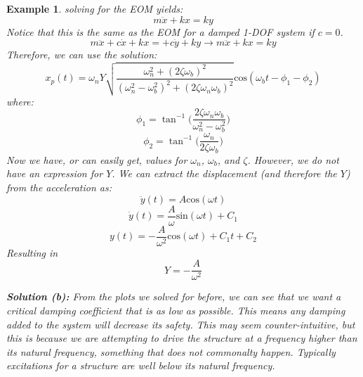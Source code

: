 \documentclass[12pt,letter]{article}
\newtheorem{ex}{Example}
\numberwithin{ex}{section} %
\newenvironment{example}{\begin{mdframed}[middlelinewidth=0.5mm]\begin{ex}\normalfont}{\end{ex}\end{mdframed}}
\numberwithin{re}{section} %
\numberwithin{vcs}{section} %
\begin{document}
\begin{example}
					solving for the EOM yields:
					\begin{equation}
						m\ddot{x} + kx = ky
					\end{equation} 				
					Notice that this is the same as the EOM for a damped 1-DOF system if $c=0$.	
					\begin{equation}
					m\ddot{x} + c\dot{x} + kx = + c\dot{y} + ky \rightarrow m\ddot{x} + kx = ky
					\end{equation}
					Therefore, we can use the solution:
					\begin{equation}
						x_p(t) = 	\omega_n Y   \sqrt{\frac{\omega_n^2 + (2 \zeta \omega_b)^2 }{(\omega_n^2 - \omega_b^2)^2 +  (2\zeta \omega_n \omega_b)^2} }  \text{cos}(\omega_bt - \phi_1 - \phi_2)
					\end{equation}
					where:
					\begin{equation}
						\phi_1 = \tan^{-1} \bigg(\frac{2\zeta \omega_n \omega_b}{\omega_n^2 - \omega_b^2}\bigg)
					\end{equation}	
					\begin{equation}
						\phi_2 = \tan^{-1} \bigg(\frac{\omega_n}{2\zeta \omega_b}\bigg)
					\end{equation}
					Now we have, or can easily get, values for $\omega_n$, $\omega_b$, and $\zeta$. However, we do not have an expression for $Y$. We can extract the displacement (and therefore the $Y$) from the acceleration as:
					\begin{equation}
						\ddot{y}(t) = A \text{cos}(\omega t)
					\end{equation} 				
					\begin{equation}
						\dot{y}(t) = \frac{A}{\omega} \text{sin}(\omega t) + C_1
					\end{equation} 					
					\begin{equation}
						y(t) = - \frac{A}{\omega^2} \text{cos}(\omega t) + C_1t + C_2
					\end{equation} 					
					Resulting in 
					\begin{equation}
						Y = -\frac{A}{\omega^2}
					\end{equation} 			
					
					\noindent\textbf{Solution (b):} From the plots we solved for before, we can see that we want a critical damping coefficient that is as low as possible. This means any damping added to the system will decrease its safety. This may seem counter-intuitive, but this is because we are attempting to drive the structure at a frequency higher than its natural frequency, something that does not commonalty happen. Typically excitations for a structure are well below its natural frequency.  			
				
				\end{example}			





	
\end{document}
